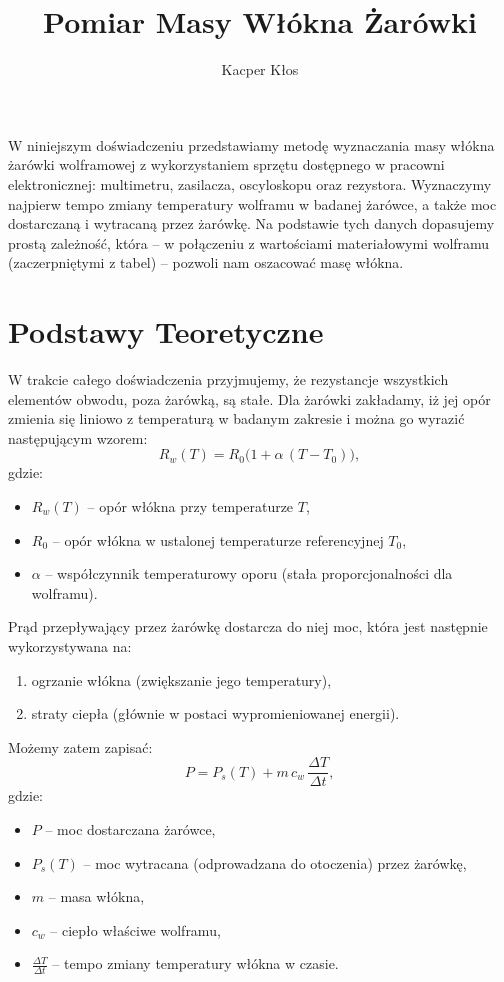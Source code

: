 \documentclass[12pt]{article}
\title{Pomiar Masy Włókna Żarówki}
\author{Kacper Kłos}
\begin{document}
\maketitle
W niniejszym doświadczeniu przedstawiamy metodę wyznaczania masy włókna żarówki wolframowej z wykorzystaniem sprzętu dostępnego w pracowni elektronicznej: multimetru, zasilacza, oscyloskopu oraz rezystora.  
Wyznaczymy najpierw tempo zmiany temperatury wolframu w badanej żarówce, a także moc dostarczaną i wytracaną przez żarówkę.  
Na podstawie tych danych dopasujemy prostą zależność, która – w połączeniu z wartościami materiałowymi wolframu (zaczerpniętymi z tabel) – pozwoli nam oszacować masę włókna.

\newpage
\section{Podstawy Teoretyczne}
W trakcie całego doświadczenia przyjmujemy, że rezystancje wszystkich elementów obwodu, poza żarówką, są stałe.  
Dla żarówki zakładamy, iż jej opór zmienia się liniowo z temperaturą w badanym zakresie i można go wyrazić następującym wzorem:
\begin{equation}
    R_w(T) = R_0 \bigl(1+\alpha\,(T - T_0)\bigr),
    \label{eq:resistance}
\end{equation}
gdzie:
\begin{itemize}
\item $R_w(T)$ – opór włókna przy temperaturze $T$,  
\item $R_0$ – opór włókna w ustalonej temperaturze referencyjnej $T_0$,  
\item $\alpha$ – współczynnik temperaturowy oporu (stała proporcjonalności dla wolframu).
\end{itemize}

Prąd przepływający przez żarówkę dostarcza do niej moc, która jest następnie wykorzystywana na:  
\begin{enumerate}
\item ogrzanie włókna (zwiększanie jego temperatury),  
\item straty ciepła (głównie w postaci wypromieniowanej energii).  
\end{enumerate}
Możemy zatem zapisać:
\begin{equation}
    P = P_s(T) + m\,c_w\,\frac{\Delta T}{\Delta t},
    \label{eq:mass}
\end{equation}
gdzie:  
\begin{itemize}
\item $P$ – moc dostarczana żarówce,  
\item $P_s(T)$ – moc wytracana (odprowadzana do otoczenia) przez żarówkę,  
\item $m$ – masa włókna,  
\item $c_w$ – ciepło właściwe wolframu,  
\item $\frac{\Delta T}{\Delta t}$ – tempo zmiany temperatury włókna w czasie.  
\end{itemize}
\end{document}
